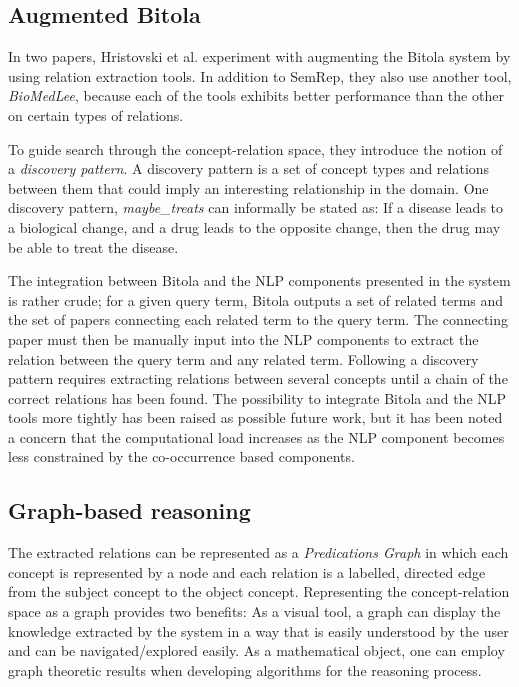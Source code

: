 \subsection{Augmented Bitola}
\label{subsec:bitola}

In two papers, Hristovski et al. \citeyearpar{hri06,hri08} experiment with augmenting the Bitola system by using relation extraction tools. In addition to SemRep, they also use another tool, \emph{BioMedLee}, because each of the tools exhibits better performance than the other on certain types of relations. 

To guide search through the concept-relation space, they introduce the notion of a \emph{discovery pattern}. A discovery pattern is a set of concept types and relations between them that could imply an interesting relationship in the domain. One discovery pattern, \emph{maybe\_treats} can informally be stated as: If a disease leads to a biological change, and a drug leads to the opposite change, then the drug may be able to treat the disease.

The integration between Bitola and the NLP components presented in the system is rather crude; for a given query term, Bitola outputs a set of related terms and the set of papers connecting each related term to the query term. The connecting paper must then be manually input into the NLP components to extract the relation between the query term and any related term. Following a discovery pattern requires extracting relations between several concepts until a chain of the correct relations has been found. The possibility to integrate Bitola and the NLP tools more tightly has been raised as possible future work, but it has been noted a concern that the computational load increases as the NLP component becomes less constrained by the co-occurrence based components.

\subsection{Graph-based reasoning}

The extracted relations can be represented as a \emph{Predications Graph} in which each concept is represented by a node and each relation is a labelled, directed edge from the subject concept to the object concept. Representing the concept-relation space as a graph provides two benefits: As a visual tool, a graph can display the knowledge extracted by the system in a way that is easily understood by the user and can be navigated/explored easily. As a mathematical object, one can employ graph theoretic results when developing algorithms for the reasoning process. 

